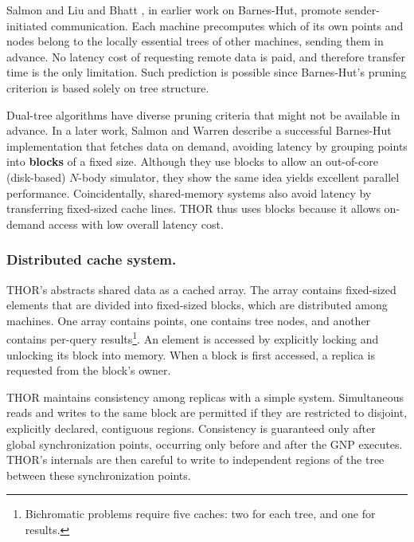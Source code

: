 \documentclass[twoside,leqno,twocolumn]{article}
\newcommand{\mysubsub}[1]{\subsubsection{#1.}}
\newcommand{\defterm}[1]{{\bf #1}}
\begin{document}
Salmon \cite{salmon_thesis} and Liu and Bhatt \cite{liu94experiences}, in earlier work on Barnes-Hut, promote sender-initiated communication.
Each machine precomputes which of its own points and nodes belong to the locally essential trees of other machines, sending them in advance.
No latency cost of requesting remote data is paid, and therefore transfer time is the only limitation.
Such prediction is possible since Barnes-Hut's pruning criterion is based solely on tree structure.

Dual-tree algorithms have diverse pruning criteria that might not be available in advance.
In a later work, Salmon and Warren describe \cite{salmon97parallel} a successful Barnes-Hut implementation that fetches data on demand, avoiding latency by grouping points into \defterm{blocks} of a fixed size.
Although they use blocks to allow an out-of-core (disk-based) $N$-body simulator, they show the same idea yields excellent parallel performance.
Coincidentally, shared-memory systems also avoid latency by transferring fixed-sized cache lines.
THOR thus uses blocks because it allows on-demand access with low overall latency cost.

\mysubsub{Distributed cache system}

THOR's abstracts shared data as a cached array.
The array contains fixed-sized elements that are divided into fixed-sized blocks, which are distributed among machines.
One array contains points, one contains tree nodes, and another contains per-query results\footnote{Bichromatic problems require five caches: two for each tree, and one for results.}.
An element is accessed by explicitly locking and unlocking its block into memory.
When a block is first accessed, a replica is requested from the block's owner.

THOR maintains consistency among replicas with a simple system.
Simultaneous reads and writes to the same block are permitted if they are restricted to disjoint, explicitly declared, contiguous regions.
Consistency is guaranteed only after global synchronization points, occurring only before and after the GNP executes.
THOR's internals are then careful to write to independent regions of the tree between these synchronization points.

\end{document}
